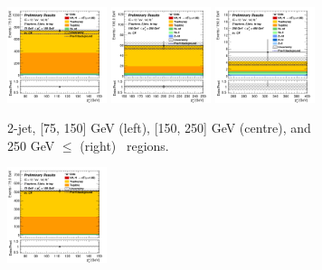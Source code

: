 \begin{figure}[h!]
    \centering
    \begin{subfigure}[b]{\textwidth}
        \centering
        \includegraphics[width=0.32\textwidth]{Images/VH/Own_fit/postfit_VHcc/Region_distpTV_BMax150_BMin75_Dtopemucr_J2_TTypeta_T2_L2_Y6051_GlobalFit_conditionnal_mu1.png}
        \includegraphics[width=0.32\textwidth]{Images/VH/Own_fit/postfit_VHcc/Region_distpTV_BMax250_BMin150_Dtopemucr_J2_TTypeta_T2_L2_Y6051_GlobalFit_conditionnal_mu1.png}
        \includegraphics[width=0.32\textwidth]{Images/VH/Own_fit/postfit_VHcc/Region_distpTV_BMax400_BMin250_Dtopemucr_J2_TTypeta_T2_L2_Y6051_GlobalFit_conditionnal_mu1.png}
        \caption{2-jet, [75, 150] GeV (left), [150, 250] GeV (centre), and 250  GeV $\leq$ (right) \ptv\ regions.}
        \label{fig:plots_VHcc_2L_topCRemu_2J}
    \end{subfigure}
    \begin{subfigure}[b]{\textwidth}
        \centering
        \includegraphics[width=0.32\textwidth]{Images/VH/Own_fit/postfit_VHcc/Region_distpTV_BMax150_BMin75_Dtopemucr_J3_TTypeta_T2_L2_Y6051_GlobalFit_conditionnal_mu1.png}

\end{subfigure}
\end{figure}

